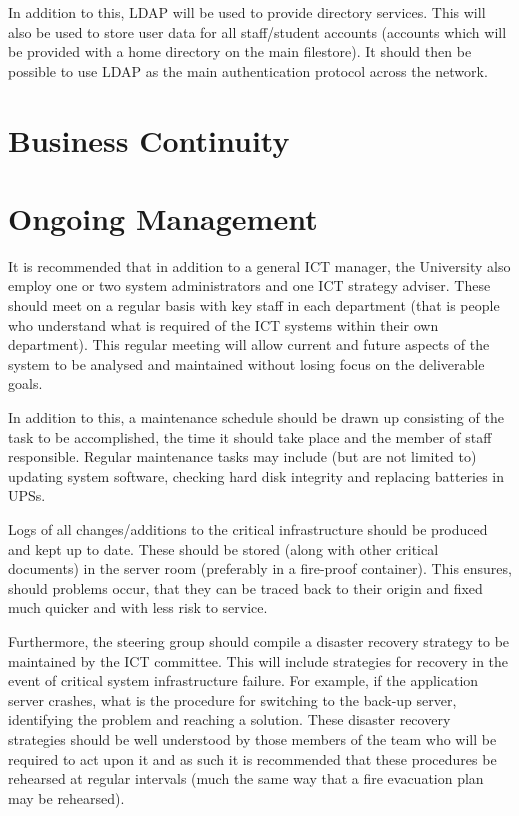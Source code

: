 \documentclass[a4paper, twoside]{article}
\begin{document}
In addition to this, LDAP will be used to provide directory services. This will
also be used to store user data for all staff/student accounts (accounts which
will be provided with a home directory on the main filestore). It should then be
possible to use LDAP as the main authentication protocol across the network.

\section{Business Continuity}

\section{Ongoing Management}
\label{sec:manage}
It is recommended that in addition to a general ICT manager, the University also
employ one or two system administrators and one ICT strategy adviser. These
should meet on a regular basis with key staff in each department (that is people
who understand what is required of the ICT systems within their own department).
This regular meeting will allow current and future aspects of the system to be
analysed and maintained without losing focus on the deliverable goals.

In addition to this, a maintenance schedule should be drawn up consisting of the
task to be accomplished, the time it should take place and the member of staff
responsible. Regular maintenance tasks may include (but are not limited to)
updating system software, checking hard disk integrity and replacing batteries
in UPSs.

Logs of all changes/additions to the critical infrastructure should be produced
and kept up to date. These should be stored (along with other critical
documents) in the server room (preferably in a fire-proof container). This
ensures, should problems occur, that they can be traced back to their origin and
fixed much quicker and with less risk to service.

Furthermore, the steering group should compile a disaster recovery strategy to
be maintained by the ICT committee. This will include strategies for recovery in
the event of critical system infrastructure failure. For example, if the
application server crashes, what is the procedure for switching to the back-up
server, identifying the problem and reaching a solution. These disaster recovery
strategies should be well understood by those members of the team who will be
required to act upon it and as such it is recommended that these procedures be
rehearsed at regular intervals (much the same way that a fire evacuation plan
may be rehearsed).
\end{document}

